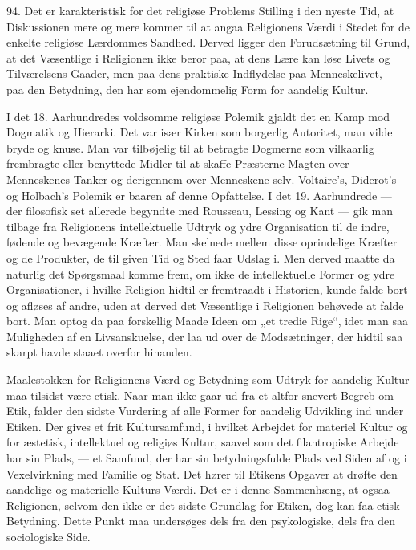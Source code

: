 \documentclass[12pt,a4paper,openany]{book}
\newcommand{\opage}[1]{\marginnote{\footnotesize\textit{[#1]}}}
\begin{document}
94. Det er karakteristisk for det religiøse Problems Stilling i den
nyeste Tid, at Diskussionen mere og mere kommer til at angaa Religionens
Værdi i Stedet for de enkelte religiøse Lærdommes Sandhed. Derved ligger
den Forudsætning til Grund, at det Væsentlige i Religionen ikke beror
paa, at dens Lære kan løse Livets og Tilværelsens Gaader, men paa dens
praktiske Indflydelse paa Menneskelivet, --- paa den Betydning, den har
som ejendommelig Form for aandelig Kultur.

I det 18. Aarhundredes voldsomme religiøse Polemik gjaldt det en Kamp
mod Dogmatik og Hierarki. Det var især Kirken som borgerlig Autoritet,
man vilde bryde og knuse. Man var tilbøjelig til at betragte Dogmerne
som vilkaarlig frembragte eller benyttede Midler til at skaffe Præsterne
Magten over Menneskenes Tanker og derigennem over Menneskene selv.
Voltaire’s, Diderot’s og Holbach’s Polemik er baaren af denne
Opfattelse. I det 19. Aarhundrede --- der filosofisk set allerede
begyndte med Rousseau, Lessing og Kant --- gik man tilbage fra
Religionens intellektuelle Udtryk og ydre Organisation til de indre,
fødende og bevægende Kræfter. Man skelnede mellem disse oprindelige
Kræfter og de Produkter, de til given Tid og Sted faar Udslag i. Men
derved maatte da naturlig det Spørgsmaal komme frem, om ikke de
intellektuelle Former og ydre Organisationer, i hvilke Religion hidtil
er fremtraadt i Historien, kunde falde bort og afløses af andre, uden at
derved det Væsentlige i Religionen behøvede at falde bort. Man optog da
paa forskellig Maade Ideen om „et
\opage{217}tredie Rige“, idet man saa Muligheden af en Livsanskuelse,
der laa ud over de Modsætninger, der hidtil saa skarpt havde staaet
overfor hinanden.

Maalestokken for Religionens Værd og Betydning som Udtryk for aandelig
Kultur maa tilsidst være etisk. Naar man ikke gaar ud fra et altfor
snevert Begreb om Etik, falder den sidste Vurdering af alle Former for
aandelig Udvikling ind under Etiken. Der gives et frit Kultursamfund, i
hvilket Arbejdet for materiel Kultur og for æstetisk, intellektuel og
religiøs Kultur, saavel som det filantropiske Arbejde har sin Plads, ---
et Samfund, der har sin betydningsfulde Plads ved Siden af og i
Vexelvirkning med Familie og Stat. Det hører til Etikens Opgaver at
drøfte den aandelige og materielle Kulturs Værdi. Det er i denne
Sammenhæng, at ogsaa Religionen, selvom den ikke er det sidste Grundlag
for Etiken, dog kan faa etisk Betydning. Dette Punkt maa undersøges dels
fra den psykologiske, dels fra den sociologiske Side.
\end{document}
